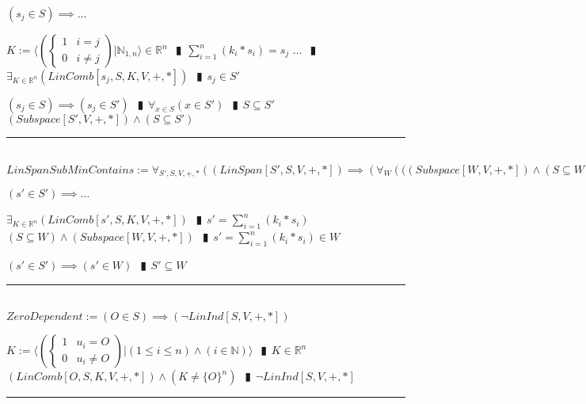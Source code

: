 \documentclass{book}
\newcommand{\abr}{:=}
\newcommand{\pipe}{$\phantom{(}\vrectangleblack\phantom{)}$}
\newcommand{\pr}[1]{\left(#1\right)}
\begin{document}
\begin{enumerate}
  \lit $(s_j \in S) \implies \ldots$
  \begin{enumerate}
    \lit $K \abr \langle \left(\begin{cases} 
      1 & i = j \\
      0 & i \neq j 
    \end{cases}\right) | \mathbb{N}_{1, n} \rangle \in \mathbb{R}^n$ \pipe $\sum_{i = 1}^{n}(k_i * s_i) = s_j$
    \lit $\ldots$ \pipe $\exists_{K \in \mathbb{R}^n}(LinComb[s_j, S, K, V, +, *])$ \pipe $s_j \in S'$
  \end{enumerate}
  \lit $(s_j \in S) \implies (s_j \in S')$ \pipe $\forall_{x \in S}(x \in S')$ \pipe $S \subseteq S'$
  \lit $(Subspace[S', V, +, *]) \land (S \subseteq S')$
\end{enumerate} \vspace{.75mm} \hrule \vspace{.75mm} \ \\ 

$LinSpanSubMinContains \abr \forall_{S', S, V, +, *}\pr{(LinSpan[S', S, V, +, *]) \implies \pr{\forall_{W}\pr{((Subspace[W, V, + ,*]) \land (S \subseteq W)} \implies (S' \subseteq W)}}$
\begin{enumerate}
  \lit $(s' \in S') \implies \ldots$
  \begin{enumerate}
    \lit $\exists_{K \in \mathbb{R}^n}(LinComb[s', S, K, V, +, *])$ \pipe $s' = \sum_{i = 1}^{n}(k_i * s_i)$
    \lit $(S \subseteq W) \land (Subspace[W, V, + ,*])$ \pipe $s' = \sum_{i = 1}^{n}(k_i * s_i) \in W$
  \end{enumerate}
  \lit $(s' \in S') \implies (s' \in W)$ \pipe $S' \subseteq W$
\end{enumerate} \vspace{.75mm} \hrule \vspace{.75mm} \ \\ 

$ZeroDependent \abr (O \in S) \implies (\lnot LinInd[S, V, +, *])$
\begin{enumerate}
  \lit $K \abr \langle \left(\begin{cases} 
      1 & u_i = O \\
      0 & u_i \neq O 
    \end{cases}\right) | (1 \leq i \leq n) \land (i \in \mathbb{N}) \rangle$ \pipe $K \in \mathbb{R}^n$
  \lit $(LinComb[O, S, K, V, +, *]) \land (K \neq \{O\}^n)$ \pipe $\lnot LinInd[S, V, +, *]$
\end{enumerate} \vspace{.75mm} \hrule \vspace{.75mm} \ \\ 
\end{document}
